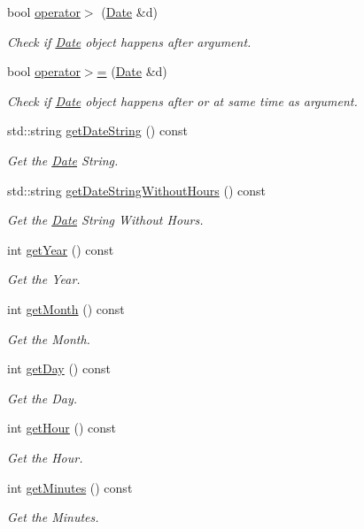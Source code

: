 \begin{DoxyCompactItemize}
bool \mbox{\hyperlink{classDate_a0c2a1a6f890da1f9a360fab87e7109a3}{operator$>$}} (\mbox{\hyperlink{classDate}{Date}} \&d)
\begin{DoxyCompactList}\small\item\em Check if \mbox{\hyperlink{classDate}{Date}} object happens after argument. \end{DoxyCompactList}\item 
bool \mbox{\hyperlink{classDate_a3dd4c3c4818d69669927bec072ff85ce}{operator$>$=}} (\mbox{\hyperlink{classDate}{Date}} \&d)
\begin{DoxyCompactList}\small\item\em Check if \mbox{\hyperlink{classDate}{Date}} object happens after or at same time as argument. \end{DoxyCompactList}\item 
std\+::string \mbox{\hyperlink{classDate_a733c89177097f0d7f5cc2f68f5593856}{get\+Date\+String}} () const
\begin{DoxyCompactList}\small\item\em Get the \mbox{\hyperlink{classDate}{Date}} String. \end{DoxyCompactList}\item 
std\+::string \mbox{\hyperlink{classDate_a54b53336c8ba897fae4d2bbb0aa84a99}{get\+Date\+String\+Without\+Hours}} () const
\begin{DoxyCompactList}\small\item\em Get the \mbox{\hyperlink{classDate}{Date}} String Without Hours. \end{DoxyCompactList}\item 
int \mbox{\hyperlink{classDate_a8b0869f34c2b38d108ab83ee2e770e5d}{get\+Year}} () const
\begin{DoxyCompactList}\small\item\em Get the Year. \end{DoxyCompactList}\item 
int \mbox{\hyperlink{classDate_a332f6e3a2f6a40d73742b6dab7be0f64}{get\+Month}} () const
\begin{DoxyCompactList}\small\item\em Get the Month. \end{DoxyCompactList}\item 
int \mbox{\hyperlink{classDate_a0f253815240e70f4c39cb93cc68bd3f4}{get\+Day}} () const
\begin{DoxyCompactList}\small\item\em Get the Day. \end{DoxyCompactList}\item 
int \mbox{\hyperlink{classDate_ab8ea9e1aafa6cb95be7b82cda0c53cfe}{get\+Hour}} () const
\begin{DoxyCompactList}\small\item\em Get the Hour. \end{DoxyCompactList}\item 
int \mbox{\hyperlink{classDate_a55251df891f43b9f19419cd79ce69876}{get\+Minutes}} () const
\begin{DoxyCompactList}\small\item\em Get the Minutes. \end{DoxyCompactList}\end{DoxyCompactItemize}

